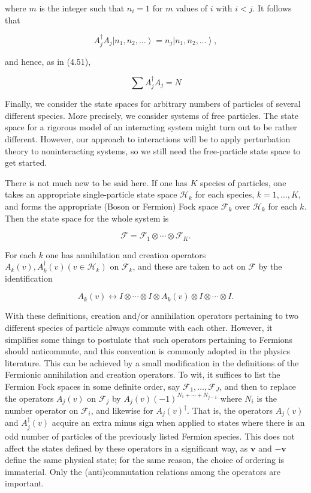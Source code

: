 \documentclass[10pt, letterpaper]{article}
\begin{document}
where $m$ is the integer such that $n_{i}=1$ for $m$ values of $i$ with $i<j$. It follows that

$$
A_{j}^{\dagger} A_{j}\left|n_{1}, n_{2}, \ldots\right\rangle=n_{j}\left|n_{1}, n_{2}, \ldots\right\rangle,
$$

and hence, as in (4.51),

$$
\sum A_{j}^{\dagger} A_{j}=N
$$


\pagebreak


Finally, we consider the state spaces for arbitrary numbers of particles of several different species. More precisely, we consider systems of free particles. The state space for a rigorous model of an interacting system might turn out to be rather different. However, our approach to interactions will be to apply perturbation theory to noninteracting systems, so we still need the free-particle state space to get started.

There is not much new to be said here. If one has $K$ species of particles, one takes an appropriate single-particle state space $\mathcal{H}_{k}$ for each species, $k=1, \ldots, K$, and forms the appropriate (Boson or Fermion) Fock space $\mathcal{F}_{k}$ over $\mathcal{H}_{k}$ for each $k$. Then the state space for the whole system is

$$
\mathcal{F}=\mathcal{F}_{1} \otimes \cdots \otimes \mathcal{F}_{K} .
$$

For each $k$ one has annihilation and creation operators $A_{k}(v), A_{k}^{\dagger}(v)\left(v \in \mathcal{H}_{k}\right)$ on $\mathcal{F}_{k}$, and these are taken to act on $\mathcal{F}$ by the identification

$$
A_{k}(v) \leftrightarrow I \otimes \cdots \otimes I \otimes A_{k}(v) \otimes I \otimes \cdots \otimes I .
$$

With these definitions, creation and/or annihilation operators pertaining to two different species of particle always commute with each other. However, it simplifies some things to postulate that such operators pertaining to Fermions should anticommute, and this convention is commonly adopted in the physics literature. This can be achieved by a small modification in the definitions of the Fermionic annihilation and creation operators. To wit, it suffices to list the Fermion Fock spaces in some definite order, say $\mathcal{F}_{1}, \ldots, \mathcal{F}_{J}$, and then to replace the operators $A_{j}(v)$ on $\mathcal{F}_{j}$ by $A_{j}(v)(-1)^{N_{1}+\cdots+N_{j-1}}$ where $N_{i}$ is the number operator on $\mathcal{F}_{i}$, and likewise for $A_{j}(v)^{\dagger}$. That is, the operators $A_{j}(v)$ and $A_{j}^{\dagger}(v)$ acquire an extra minus sign when applied to states where there is an odd number of particles of the previously listed Fermion species. This does not affect the states defined by these operators in a significant way, as $\mathbf{v}$ and $-\mathbf{v}$ define the same physical state; for the same reason, the choice of ordering is immaterial. Only the (anti)commutation relations among the operators are important.
\end{document}
